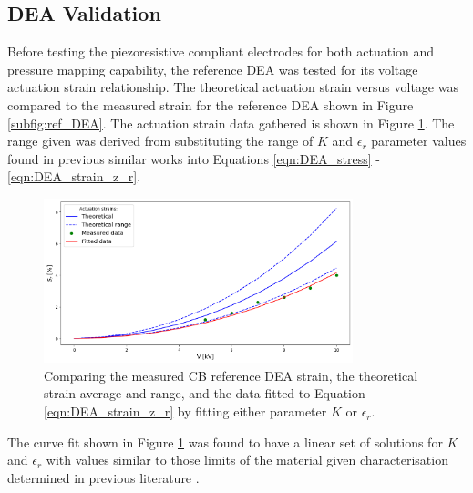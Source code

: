 \subsection{DEA Validation}
\label{subsec:dea_validation2}
Before testing the piezoresistive compliant electrodes for both actuation and pressure mapping capability, the reference DEA was tested for its voltage actuation strain relationship. The theoretical actuation strain versus voltage was compared to the measured strain for the reference DEA shown in Figure \ref{subfig:ref_DEA}. The actuation strain data gathered is shown in Figure \ref{fig:ref_DEA_results}. The range given was derived from substituting the range of $K$ and $\epsilon_r$ parameter values found in previous similar works \cite{Liu2018, Helal2018, Huang2023} into Equations \ref{eqn:DEA_stress} - \ref{eqn:DEA_strain_z_r}.
\begin{figure}[H]
	\centering
	\includegraphics[width = 0.8\textwidth]{Figures/CB_vs_theory_range_vs_fitv2.png} %
	\vspace{0.2cm}
	\caption{Comparing the measured CB reference DEA strain, the theoretical strain average and range, and the data fitted to Equation \ref{eqn:DEA_strain_z_r} by fitting either parameter $K$ or $\epsilon_r$.}
	\label{fig:ref_DEA_results}
\end{figure}
The curve fit shown in Figure \ref{fig:ref_DEA_results} was found to have a linear set of solutions for $K$ and $\epsilon_r$ with values similar to those limits of the material given characterisation determined in previous literature \cite{Carpi2003} .

